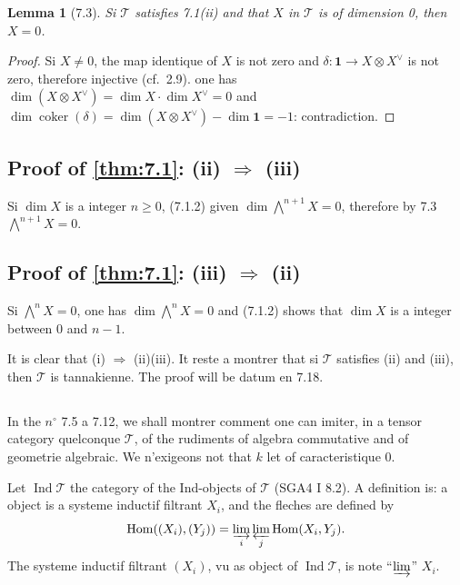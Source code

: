 \documentclass[12pt,a4paper]{article}
\theoremstyle{plain}
\newtheorem{lemma}[theorem]{Lemma}
\theoremstyle{definition}
\DeclareMathOperator{\Hom}{Hom}
\DeclareMathOperator{\Ind}{Ind}
\DeclareMathOperator{\coker}{coker}
\begin{document}
\begin{lemma}[7.3]
Si $\mathcal{T}$ satisfies 7.1\textup{(ii)} and that $X$ in $\mathcal{T}$ is of dimension 0, then $X = 0$.
\end{lemma}

\begin{proof}
Si $X \neq 0$, the map identique of $X$ is not zero and $\delta : \mathbf{1} \to X \otimes X^\vee$ is not zero, therefore injective (cf.~2.9). one has $\dim(X \otimes X^\vee) = \dim X \cdot \dim X^\vee = 0$ and $\dim \coker(\delta) = \dim(X \otimes X^\vee) - \dim \mathbf{1} = -1$: contradiction.
\end{proof}

\subsection{Proof of \ref{thm:7.1}: (ii) $\Rightarrow$ (iii)}

Si $\dim X$ is a integer $n \geq 0$, (7.1.2) given $\dim \bigwedge^{n+1} X = 0$, therefore by 7.3 $\bigwedge^{n+1} X = 0$.

\subsection{Proof of \ref{thm:7.1}: (iii) $\Rightarrow$ (ii)}

Si $\bigwedge^n X = 0$, one has $\dim \bigwedge^n X = 0$ and (7.1.2) shows that $\dim X$ is a integer between 0 and $n-1$.

It is clear that (i) $\Rightarrow$ (ii)(iii). It reste a montrer that si $\mathcal{T}$ satisfies (ii) and (iii), then $\mathcal{T}$ is tannakienne. The proof will be datum en 7.18.

\subsection{}

In the $n^\circ$ 7.5 a 7.12, we shall montrer comment one can imiter, in a tensor category quelconque $\mathcal{T}$, of the rudiments of algebra commutative and of geometrie algebraic. We n'exigeons not that $k$ let of caracteristique 0.

Let $\Ind\mathcal{T}$ the category of the Ind-objects of $\mathcal{T}$ (SGA4 I 8.2). A definition is: a object is a systeme inductif filtrant $X_i$, and the fleches are defined by
\[
\Hom((X_i), (Y_j)) = \varinjlim_i \varprojlim_j \Hom(X_i, Y_j).
\]
The systeme inductif filtrant $(X_i)$, vu as object of $\Ind\mathcal{T}$, is note ``$\varinjlim$'' $X_i$.
\end{document}

